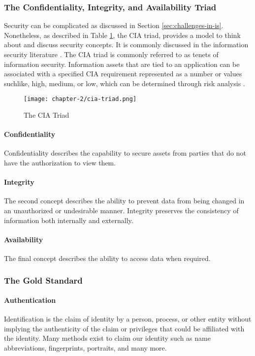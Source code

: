 \subsubsection{The Confidentiality, Integrity, and Availability Triad}\label{subsec:cia}
Security can be complicated as discussed in Section \ref{sec:challenges-in-is}. Nonetheless, as described in Table \ref{fig:cia}, the CIA triad, provides a model to think about and discuss security concepts. It is commonly discussed in the information security literature \cite{andress2014the} \cite{srinivasan2016cissp} \cite{death2017information}. The CIA triad is commonly referred to as tenets of information security. Information assets that are tied to an application can be associated with a specified CIA requirement represented as a number or values suchlike, high, medium, or low, which can be determined through risk analysis \cite{srinivasan2016cissp}. 

\begin{figure}
    \centering
    \texttt{[image: chapter-2/cia-triad.png]}
    \caption{The CIA Triad}\label{fig:cia}
\end{figure}

\paragraph{Confidentiality}
Confidentiality describes the capability to secure assets from parties that do not have the authorization to view them. 

\paragraph{Integrity}
The second concept describes the ability to prevent data from being changed in an unauthorized or undesirable manner. Integrity preserves the consistency of information both internally and externally.

\paragraph{Availability}
The final concept describes the ability to access data when required.

\subsubsection{The Gold Standard}

\paragraph{Authentication}
Identification is the claim of identity by a person, process, or other entity without implying the authenticity of the claim or privileges that could be affiliated with the identity. Many methods exist to claim our identity such as name abbreviations, fingerprints, portraits, and many more.


